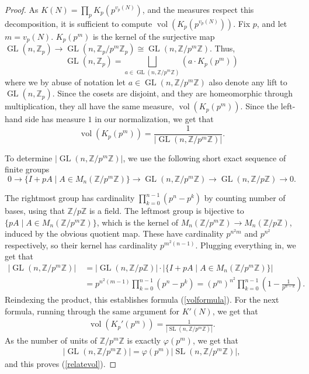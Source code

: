 \documentclass[11pt,reqno]{amsart}
\numberwithin{equation}{section}
\theoremstyle{definition}
\theoremstyle{remark}
\newcommand{\GL}{\operatorname{GL}}
\newcommand{\SL}{\operatorname{SL}}
\newcommand{\vol}{\operatorname{vol}}
\newcommand{\Z}{\mathbb{Z}}
\renewcommand{\phi}{\varphi}
\begin{document}
\begin{proof}
As $K(N) = \prod_p K_p(p^{v_p(N)})$, and the measures respect this decomposition, it is sufficient to compute $\vol(K_p(p^{v_p(N)}))$. Fix $p$, and let $m=v_p(N)$. $K_p(p^m)$ is the kernel of the surjective map $\GL(n,\Z_p)\to\GL(n,\Z_p/p^m\Z_p)\cong \GL(n,\Z/p^m\Z)$. Thus,
$$\GL(n,\Z_p)=\bigsqcup_{a\in\GL(n,\Z/p^m\Z)}(a\cdot K_p(p^m))$$
where we by abuse of notation let $a\in\GL(n,\Z/p^m\Z)$ also denote any lift to $\GL(n,\Z_p)$. Since the cosets are disjoint, and they are homeomorphic through multiplication, they all have the same measure, $\vol(K_p(p^m))$. Since the left-hand side has measure $1$ in our normalization, we get that 
$$\vol(K_p(p^m))=\frac{1}{|\GL(n,\Z/p^m\Z)|}.$$

\noindent To determine $|\GL(n,\Z/p^m\Z)|$, we use the following short exact sequence of finite groups
$$0\to\lbrace I+pA\mid A\in M_n(\Z/p^m\Z)\rbrace\to \GL(n,\Z/p^m\Z)\to \GL(n,\Z/p\Z)\to 0.$$

\noindent The rightmost group has cardinality $\prod_{k=0}^{n-1}(p^n-p^k)$ by counting number of bases, using that $\Z/p\Z$ is a field. The leftmost group is bijective to $\lbrace pA\mid A\in M_n(\Z/p^m\Z)\rbrace$, which is the kernel of $M_n(\Z/p^m\Z)\to M_n(\Z/p\Z)$, induced by the obvious quotient map. These have cardinality $p^{n^2m}$ and $p^{n^2}$ respectively, so their kernel has cardinality $p^{m^2(n-1)}$. Plugging everything in, we get that
\begin{align}\label{localvol}
 |\GL(n,\Z/p^m\Z)|\:&= |\GL(n,\Z/p\Z)|\cdot |\lbrace I+pA\mid A\in M_n(\Z/p^m\Z)\rbrace| \\
&= p^{n^2(m-1)}\prod_{k=0}^{n-1}(p^n-p^k) = (p^{m})^{n^2}\prod_{k=0}^{n-1}\left(1-\frac{1}{p^{n-k}}\right).
\end{align}
Reindexing the product, this establishes formula (\ref{volformula}). For the next formula, running through the same argument for $K'(N)$, we get that
\begin{align}\label{SLnlocalvol}
    \vol(K_p'(p^{m})) = \frac{1}{|\SL(n,\Z/p^m\Z)|}.
\end{align}
As the number of units of $\Z/p^m\Z$ is exactly $\phi(p^m)$, we get that 
\begin{align*}
    |\GL(n,\Z/p^m\Z)| = \phi(p^m) |\SL(n,\Z/p^m\Z)|,
\end{align*}
and this proves (\ref{relatevol}). 


\end{proof}
\end{document}
